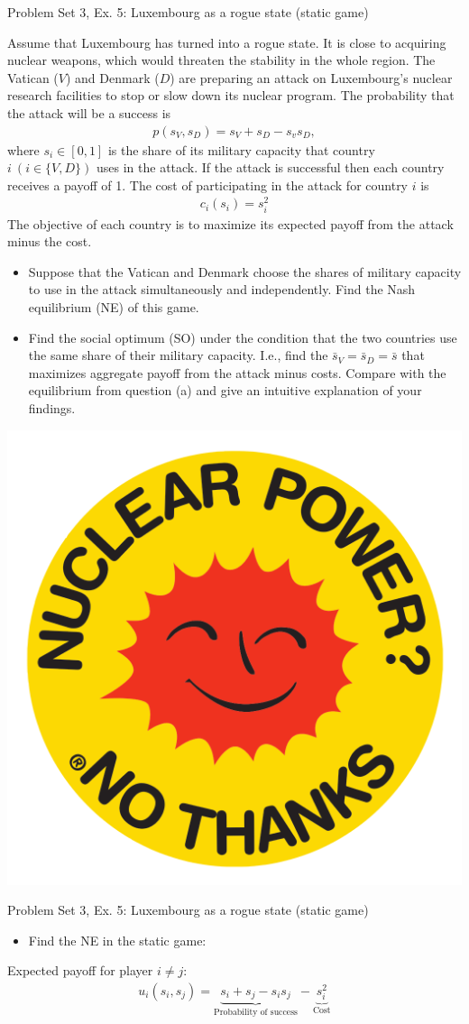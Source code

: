 \begin{frame}{Problem Set 3, Ex. 5: Luxembourg as a rogue state (static game)}
  \begin{multicols}{2}
    Assume that Luxembourg has turned into a rogue state. It is close to acquiring nuclear weapons, which would threaten the stability in the whole region. The Vatican ($V$) and Denmark ($D$) are preparing an attack on Luxembourg’s nuclear research facilities to stop or slow down its nuclear program. The probability that the attack will be a success is
    \begin{align*}
      p(s_V,s_D)=s_V+s_D-s_vs_D,
    \end{align*}
    where $s_i\in[0,1]$ is the share of its military capacity that country $i\ (i\in\{V,D\})$ uses in the attack. If the attack is successful then each country receives a payoff of 1. The cost of participating in the attack for country $i$ is
    \begin{align*}
      c_i(s_i)=s_i^2
    \end{align*}
    The objective of each country is to maximize its expected payoff from the attack minus the cost.
  \vfill\null\columnbreak
    \begin{itemize}
      \item[(a)] Suppose that the Vatican and Denmark choose the shares of military capacity to use in the attack simultaneously and independently. Find the Nash equilibrium (NE) of this game.
      \item[(b)] Find the social optimum (SO) under the condition that the two countries use the same share of their military capacity. I.e., find the $\bar{s}_V=\bar{s}_D=\bar{s}$ that maximizes aggregate payoff from the attack minus costs. Compare with the equilibrium from question (a) and give an intuitive explanation of your findings.
    \end{itemize}
    \hfill \includegraphics[width=0.20 \textwidth]{figures/nuclear}
  \vfill\null
  \end{multicols}
\end{frame}
\begin{frame}{Problem Set 3, Ex. 5: Luxembourg as a rogue state (static game)}
  \begin{multicols}{2}
    \begin{itemize}
      \item[(a)] Find the NE in the static game:
    \end{itemize}
    Expected payoff for player $i\neq j$:
    \begin{align*}
      u_i(s_i,s_j)=\underbrace{s_i+s_j-s_is_j}_\text{Probability of success}-\underbrace{s_i^2}_\text{Cost}
    \end{align*}
  \vfill\null\columnbreak
  \vfill\null
  \end{multicols}
\end{frame}

